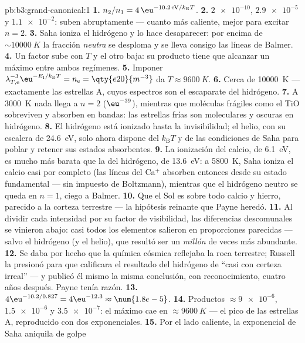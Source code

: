 \begin{solution}{pb:b3:grand-canonical:1}
\textbf{1.} $n_2/n_1 = 4\,\eu^{-10.2\,\text{eV}/k_{\text{B}}T}$.
\textbf{2.} $\num{2e-10}$, $\num{2.9e-5}$ y $\num{1.1e-2}$: suben
abruptamente --- cuanto más caliente, mejor para excitar $n = 2$.
\textbf{3.} Saha ioniza el hidrógeno y lo hace desaparecer: por encima de
$\sim\qty{10000}{K}$ la fracción \emph{neutra} se desploma y se lleva
consigo las líneas de Balmer.
\textbf{4.} Un factor sube con $T$ y el otro baja: su
producto tiene que alcanzar un máximo entre ambos regímenes.
\textbf{5.} Imponer $\lambda_{T,\text{e}}^{-3}\eu^{-E_{\text{I}}/
k_{\text{B}}T} = n_{\text{e}} = \qty{e20}{m^{-3}}$ da $T
\approx \qty{9600}{K}$.
\textbf{6.} Cerca de \qty{10000}{K} --- exactamente las estrellas A, cuyos
espectros son el escaparate del hidrógeno.
\textbf{7.} A \qty{3000}{K} nada llega a $n = 2$
($\eu^{-39}$), mientras que moléculas frágiles como el TiO sobreviven y
absorben en bandas: las estrellas frías son moleculares y oscuras en
hidrógeno.
\textbf{8.} El hidrógeno está ionizado hasta la invisibilidad; el helio, con
su escalera de \qty{24.6}{eV}, solo ahora dispone del $k_{\text{B}}T$ y de
las condiciones de Saha para poblar y retener sus estados absorbentes.
\textbf{9.} La ionización del calcio, de \qty{6.1}{eV}, es mucho más barata
que la del hidrógeno, de \qty{13.6}{eV}: a \qty{5800}{K}, Saha ioniza
el calcio casi por completo (las líneas del Ca$^+$ absorben entonces desde su
estado fundamental --- sin impuesto de Boltzmann), mientras que el hidrógeno
neutro se queda en $n = 1$, ciego a Balmer.
\textbf{10.} Que el Sol es sobre todo calcio y hierro, parecido a
la corteza terrestre --- la hipótesis reinante que Payne heredó.
\textbf{11.} Al dividir cada intensidad por su factor de visibilidad,
las diferencias descomunales se vinieron abajo: casi todos los elementos
salieron en proporciones parecidas --- salvo el hidrógeno (y el helio), que
resultó ser un \emph{millón} de veces más abundante.
\textbf{12.} Se daba por hecho que la química cósmica reflejaba la roca
terrestre; Russell la presionó para que calificara el resultado del
hidrógeno de ``casi con certeza irreal'' --- y publicó él mismo la misma
conclusión, con reconocimiento, cuatro años después. Payne tenía razón.
\textbf{13.} $4\eu^{-10.2/0.827} = 4\eu^{-12.3} \approx
\num{1.8e-5}$.
\textbf{14.} Productos $\approx \num{9e-6}$, $\num{1.5e-6}$ y
$\num{3.5e-7}$: el máximo cae en $\approx\qty{9600}{K}$ --- el
pico de las estrellas A, reproducido con dos exponenciales.
\textbf{15.} Por el lado caliente, la exponencial de Saha aniquila de golpe

\end{solution}
